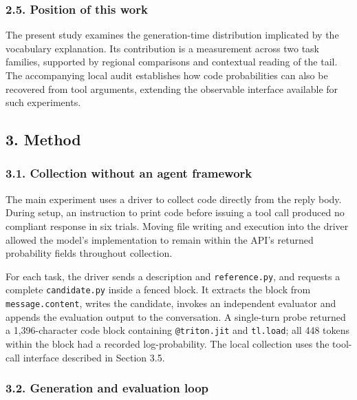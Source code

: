 \documentclass[
  11pt,
]{article}
\begin{document}
\hypertarget{position-of-this-work}{%
\subsubsection{2.5. Position of this work}\label{position-of-this-work}}

The present study examines the generation-time distribution implicated
by the vocabulary explanation. Its contribution is a measurement across
two task families, supported by regional comparisons and contextual
reading of the tail. The accompanying local audit establishes how code
probabilities can also be recovered from tool arguments, extending the
observable interface available for such experiments.

\hypertarget{method}{%
\subsection{3. Method}\label{method}}

\hypertarget{collection-without-an-agent-framework}{%
\subsubsection{3.1. Collection without an agent
framework}\label{collection-without-an-agent-framework}}

The main experiment uses a driver to collect code directly from the
reply body. During setup, an instruction to print code before issuing a
tool call produced no compliant response in six trials. Moving file
writing and execution into the driver allowed the model's implementation
to remain within the API's returned probability fields throughout
collection.

For each task, the driver sends a description and \texttt{reference.py},
and requests a complete \texttt{candidate.py} inside a fenced block. It
extracts the block from \texttt{message.content}, writes the candidate,
invokes an independent evaluator and appends the evaluation output to
the conversation. A single-turn probe returned a 1,396-character code
block containing \texttt{@triton.jit} and \texttt{tl.load}; all 448
tokens within the block had a recorded log-probability. The local
collection uses the tool-call interface described in Section 3.5.

\hypertarget{the-loop}{%
\subsubsection{3.2. Generation and evaluation loop}\label{the-loop}}
\end{document}
